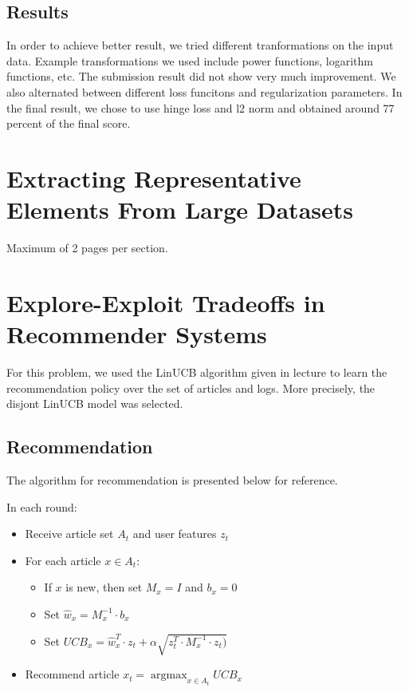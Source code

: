 \documentclass[a4paper, 11pt]{article}
\begin{document}
\subsection{Results}
In order to achieve better result, we tried different tranformations on the input data. Example transformations we used include power functions, logarithm functions, etc. The submission result did not show very much improvement. We also alternated between different loss funcitons and regularization parameters. In the final result, we chose to use hinge loss and l2 norm and obtained around 77 percent of the final score.

\newpage

\section{Extracting Representative Elements From Large Datasets}
Maximum of 2 pages per section.

\newpage

\section{Explore-Exploit Tradeoffs in Recommender Systems}
For this problem, we used the LinUCB algorithm given in lecture to learn the recommendation policy over the set of articles and logs. More precisely, the disjont LinUCB model was selected.

\subsection{Recommendation}

The algorithm for recommendation is presented below for reference.
\newline

In each round:
\begin{itemize}

\item Receive article set $A_t$ and user features $z_t$
\item For each article $x \in A_t$:

\begin{itemize}

    \item If $x$ is new, then set $M_x = I$ and $b_x = 0$
    \item Set $\hat{w}_x = M_x^{-1} \cdot b_x$
    \item Set $UCB_x = \hat{w}_x^T \cdot z_t + \alpha \sqrt{z_t^T \cdot M_x^{-1} \cdot z_t)}$

\end{itemize}
        
\item Recommend article $x_t = 
    \operatorname{argmax}_{x \in A_t} UCB_x$
        
\end {itemize}
\end{document}
